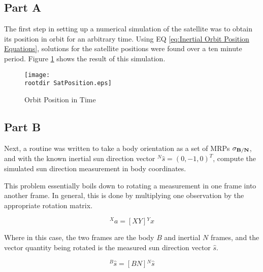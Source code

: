 \documentclass[]{aiaa-tc}%
\newcommand{\rootdir}{./Figures/}
\begin{document}
\subsection{Part A}
The first step in setting up a numerical simulation of the satellite was to obtain its position in orbit for an arbitrary time. Using EQ \ref{eq:Inertial Orbit Position Equations}, solutions for the satellite positions were found over a ten minute period. Figure \ref{fig:Satellite Position} shows the result of this simulation. 

\begin{centering}
	\begin{figure}[Hh]
		\texttt{[image: \\rootdir SatPosition.eps]}
		\caption{Orbit Position in Time}
		\label{fig:Satellite Position}
	\end{figure}
\end{centering}






\subsection{Part B}
Next, a routine was written to take a body orientation as a set of MRPs $\bf{\sigma}_{B/N}$, and with the known inertial sun direction vector $^N\hat{s}=(0,-1,0)^T$, compute the simulated sun direction measurement in body coordinates. 

This problem essentially boils down to rotating a measurement in one frame into another frame. In general, this is done by multiplying one observation by the appropriate rotation matrix. 

\begin{displaymath}
	^Xa = [XY] {^Yx}
\end{displaymath}

Where in this case, the two frames are the body $B$ and inertial $N$ frames, and the vector quantity being rotated is the measured sun direction vector $\hat{s}$.

\begin{displaymath}
	^B\hat{s} = [BN] {^N\hat{s}}
\end{displaymath}
\end{document}
